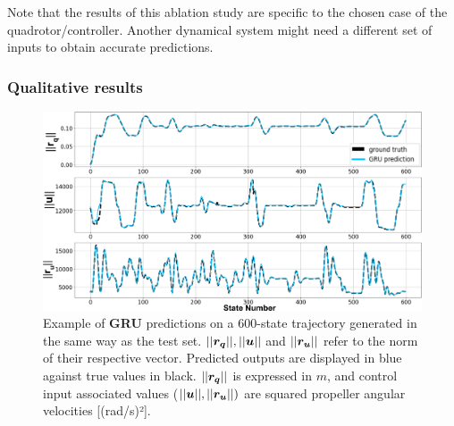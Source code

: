 Note that the results of this ablation study are specific to the chosen case of the quadrotor/controller.
Another dynamical system might need a different set of inputs to obtain accurate predictions.

\subsubsection{Qualitative results}

\begin{figure}[htp]
    \centering
    \includegraphics[width=0.99\linewidth]{figures/learning_quadrotor/long_pred.png}
    \caption{Example of \textbf{GRU} predictions on a 600-state trajectory generated in the same way as the test set. $||\boldsymbol{r_q}||, ||\boldsymbol{u}||$ and $||\boldsymbol{r_u}||$ refer to the norm of their respective vector. Predicted outputs are displayed in blue against true values in black. $||\boldsymbol{r_q}||$ is expressed in $m$, and control input associated values ($||\boldsymbol{u}||,||\boldsymbol{r_u}||)$ are squared propeller angular velocities [(rad/s)²].}
    \label{fig:long_test}
\end{figure}

